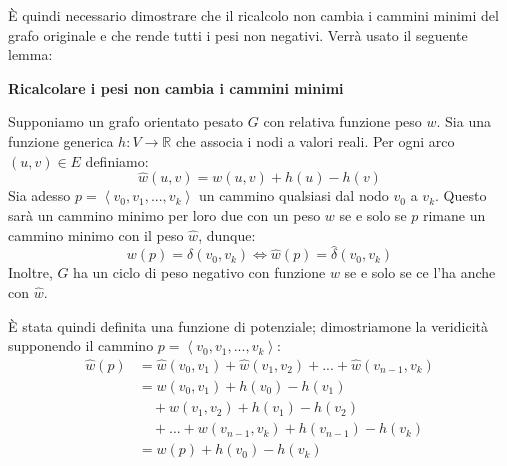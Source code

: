 \noindent È quindi necessario dimostrare che il ricalcolo non cambia i cammini minimi del grafo originale e che rende tutti i pesi non negativi. Verrà
usato il seguente lemma: \begin{lemma}
	\textbf{Ricalcolare i pesi non cambia i cammini minimi}\par
	\noindent Supponiamo un grafo orientato pesato $G$ con relativa funzione peso $w$. Sia una funzione generica $h:V\to\mathbb{R}$ che associa i nodi a
	valori reali. Per ogni arco $(u,v)\in E$ definiamo: \[
	\hat{w}(u,v) = w(u,v) + h(u)-h(v)
	\]
	\noindent Sia adesso $p = \left<v_0, v_1, ..., v_k \right>$ un cammino qualsiasi dal nodo $v_0$ a $v_k$. Questo sarà un cammino minimo per loro due
	con un peso $w$ se e solo se $p$ rimane un cammino minimo con il peso $\hat{w}$, dunque: \[
	w(p) = \delta(v_0, v_k) \iff \hat{w}(p) = \hat{\delta}(v_0, v_k)
	\]
	\noindent Inoltre, $G$ ha un ciclo di peso negativo con funzione $w$ se e solo se ce l'ha anche con $\hat{w}$.
\end{lemma}

\noindent È stata quindi definita una funzione di potenziale; dimostriamone la veridicità supponendo il cammino $p = \left<v_0, v_1, ..., v_k\right>$:
\begin{equation}
	\begin{split}
		\hat{w}(p) &= \hat{w}(v_0, v_1) + \hat{w}(v_1, v_2) + ... + \hat{w}(v_{n-1}, v_k)\\
			&= w(v_0, v_1) + h(v_0) - h(v_1)\\
			&\quad+ w(v_1, v_2) + h(v_1) - h(v_2)\\
			&\quad+ ... + w(v_{n-1}, v_k) + h(v_{n-1}) - h(v_k)\\
			&= w(p) + h(v_0) - h(v_k)
	\end{split}
\end{equation}

